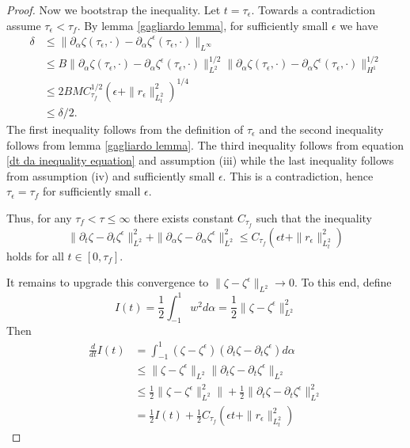 \documentclass{article}[12pt]
\theoremstyle{Theorem}
\begin{document}
\begin{proof}
    Now we bootstrap the inequality. Let $t = \tau_\epsilon$. Towards a contradiction assume $\tau_\epsilon <\tau_f$. By lemma \ref{gagliardo lemma}, for sufficiently small $\epsilon$ we have 
    \begin{align}
        \delta &\leq \|\partial_\alpha\zeta(\tau_\epsilon,\cdot) - \partial_\alpha\zeta^\epsilon(\tau_\epsilon,\cdot)\|_{L^\infty} \\ 
        &\leq B\|\partial_\alpha\zeta(\tau_\epsilon,\cdot) - \partial_\alpha\zeta^\epsilon(\tau_\epsilon,\cdot)\|_{L^2}^{1/2}\|\partial_\alpha\zeta(\tau_\epsilon,\cdot) - \partial_\alpha\zeta^\epsilon(\tau_\epsilon,\cdot)\|_{H^1}^{1/2} \\ &\leq 2BMC_{\tau_f}^{1/2}(\epsilon + \|r_\epsilon\|^2_{L^2_t}) ^{1/4} \\ 
        &\leq \delta/2.
    \end{align}
The first inequality follows from the definition of $\tau_\epsilon$ and the second inequality follows from lemma \ref{gagliardo lemma}. The third inequality follows from equation \eqref{dt da inequality equation} and assumption (iii) while the last inequality follows from assumption (iv) and sufficiently small $\epsilon$. This is a contradiction, hence $\tau_\epsilon =\tau_f$ for sufficiently small $\epsilon$. 
\newline

Thus, for any $\tau_f <\tau \leq \infty$ there exists constant $C_{\tau_f}$ such that the inequality 
\begin{equation}
        \|\partial_t\zeta - \partial_t\zeta^\epsilon \|^2_{L^2} + \|\partial_\alpha\zeta - \partial_\alpha\zeta^\epsilon \|^2_{L^2}\leq C_{\tau_f} (\epsilon t + \|r_\epsilon\|^2_{L^2_t})
    \end{equation}
holds for all $t\in[0,\tau_f]$.
\newline

It remains to upgrade this convergence to $\|\zeta - \zeta^\epsilon\|_{L^2}\rightarrow 0$. To this end, define 
$$I(t) = \frac{1}{2}\int_{-1}^1w^2d\alpha =\frac{1}{2}\|\zeta - \zeta^\epsilon\|_{L^2}^2 $$
Then \begin{align}
    \frac{d}{dt}I(t) &= \int_{-1}^1(\zeta -\zeta^\epsilon)(\partial_t\zeta - \partial_t\zeta^\epsilon)d\alpha \\
    &\leq \|\zeta -\zeta^\epsilon\|_{L^2}\|\partial_t\zeta -\partial_t\zeta^\epsilon\|_{L^2} \\
    &\leq \frac{1}{2}\|\zeta -\zeta^\epsilon\|^2_{L^2}\| + \frac{1}{2}\|\partial_t\zeta -\partial_t\zeta^\epsilon\|^2_{L^2} \\
    &= \frac{1}{2}I(t) +\frac{1}{2}C_{\tau_f} (\epsilon t + \|r_\epsilon\|^2_{L^2_t})
\end{align}


\end{proof}
\end{document}
